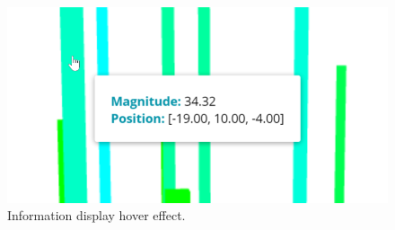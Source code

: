 
\begin{figure}[H]
	\centering
	\includegraphics[scale=1.5]{images/implementation/information_display}
	\caption[Information display hover effect]{Information display hover effect.}
	\label{fig:information_display_hover_effect}
\end{figure}
